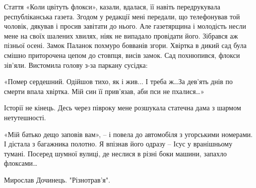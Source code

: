 Стаття «Коли цвітуть флокси», казали, вдалася, її навіть передрукувала
республіканська газета. Згодом у редакції мені передали, що телефонував той
чоловік, дякував і просив завітати до нього. Але газетярщина і молодість несли
мене на своїх шалених хвилях, ніяк не випадало провідати його. Зібрався аж
пізньої осені. Замок Паланок похмуро бовванів згори. Хвіртка в дикий сад була
смішно приторочена цепом до стовпця, висів замок. Сад похнюпився, флокси
зів’яли. Вистомила голову з-за паркану сусідка:

«Помер сердешний. Одійшов тихо, як і жив... І треба ж…За дев’ять днів по
смерти впала хвіртка. Мій син її прив’язав, аби пси не пхалися…»

 Історії не кінець. Десь через півроку мене розшукала статечна дама з шармом
 нетутешності.

«Мій батько дещо заповів вам», – і повела до автомобіля з угорськими номерами.
І дістала з багажника полотно. Я впізнав його одразу – Ісус у вранішньому
тумані. Посеред шумної вулиці, де неслися в різні боки машини, запахло
флоксами…

Мирослав Дочинець. "Різнотрав'я".
